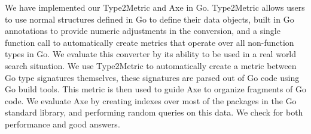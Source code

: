 We have implemented our Type2Metric and Axe in Go.
Type2Metric allows users to use normal structures defined in Go to define their data objects, 
built in Go annotations to provide numeric adjustments in the conversion, 
and a single function call to automatically create metrics that operate over all non-function types in Go.
We evaluate this converter by its ability to be used in a real world search situation.
We use Type2Metric to automatically create a metric between Go type signatures themselves,
these signatures are parsed out of Go code using Go build tools.
This metric is then used to guide Axe to organize fragments of Go code.
We evaluate Axe by creating indexes over most of the packages in the Go standard library,
and performing random queries on this data.
We check for both performance and good answers.